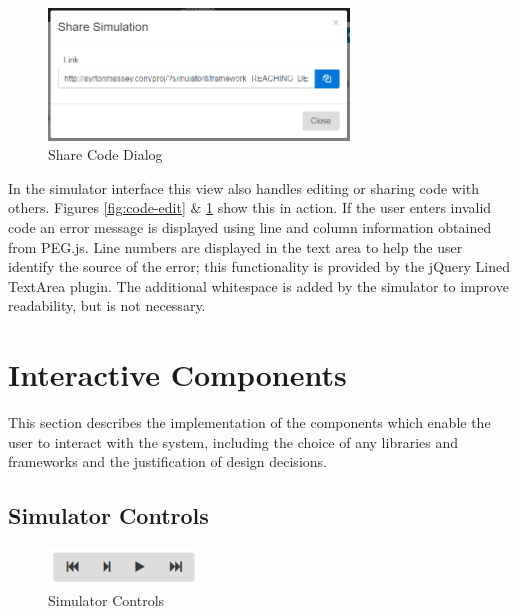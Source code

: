\documentclass[bsc,twoside,singlespacing,parskip,logo,notimes,normalheadings]{infthesis}
\begin{document}
        \begin{figure}[!ht]
          \centering
          \includegraphics[width=8cm]{img/code-share.png}
          \caption{Share Code Dialog}\label{fig:code-share}
        \end{figure}

        In the simulator interface this view also handles editing or
        sharing code with others. Figures \ref{fig:code-edit} \&
        \ref{fig:code-share} show this in action. If the user enters
        invalid code an error message is displayed using line and
        column information obtained from PEG.js. Line numbers are
        displayed in the text area to help the user identify the
        source of the error; this functionality is provided by the
        jQuery Lined TextArea\cite{jquerylinedtextarea} plugin. The
        additional whitespace is added by the simulator to improve
        readability, but is not necessary.
        

    \section{Interactive Components}
    This section describes the implementation of the components which
    enable the user to interact with the system, including the choice
    of any libraries and frameworks and the justification of design
    decisions.
    
        \subsection{Simulator Controls}

        \begin{figure}
          \centering
          \includegraphics[width=4cm, trim=0 0 0 30]{img/simcontrols.png}
          \captionsetup{width=4cm, justification=centering}
          \caption{Simulator Controls}\label{fig:simcontrols}
        \end{figure}
\end{document}
